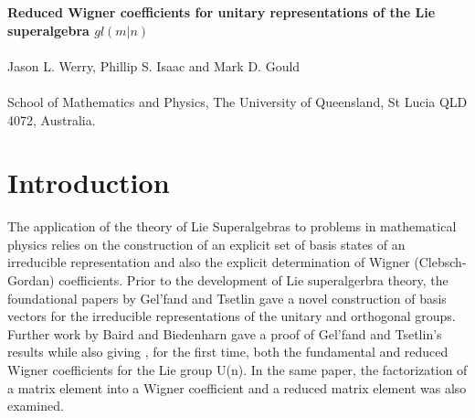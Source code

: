 \documentclass[12pt]{article}
\begin{document}
\begin{center}
{\large\bf Reduced Wigner coefficients for unitary representations
of the Lie superalgebra $gl(m|n)$}\\
~~\\

{\large Jason L. Werry, Phillip S. Isaac and Mark D. Gould}\\
~~\\

School of Mathematics and Physics, The University of Queensland, St Lucia QLD 4072, Australia.
\end{center}

\begin{abstract}
In this paper fundamental Wigner coefficients are determined
algebraically by considering the eigenvalues of certain generalized Casimir invariants. Here this
method is applied in the context of both type 1 and type 2 unitary representations of the Lie superalgebra $gl(m|n)$.
\end{abstract}

% 

\section{Introduction}
The application of the theory of Lie Superalgebras to problems in mathematical physics relies on the construction of an explicit set of basis states of an irreducible representation and also the explicit
determination of Wigner (Clebsch-Gordan) coefficients. Prior to the development of Lie superalgerbra theory, the foundational papers by Gel'fand and Tsetlin \cite{GT1950,GT1950b} gave a novel construction of basis vectors for the irreducible representations of the unitary and orthogonal groups. Further work by Baird and Biedenharn \cite{BB1963} gave a proof of Gel'fand and Tsetlin's results while also giving , for the first time, both the fundamental and reduced Wigner coefficients for the Lie group U(n). In the same paper, the factorization of a matrix element into a Wigner coefficient and a reduced matrix element was also examined.
\end{document}
